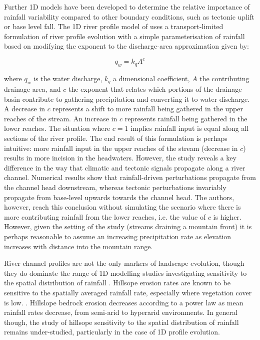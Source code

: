 Further 1D models have been developed to determine the relative importance of rainfall variability compared to other boundary conditions, such as tectonic uplift or base level fall. The 1D river profile model of \citet{Wobus2010} uses a transport-limited formulation of river profile evolution \citep{meyer1948formulas} with a simple parameterisation of rainfall based on modifying the exponent to the discharge-area approximation given by:

\begin{equation}
q_w = k_qA^c
\end{equation}

\noindent
where \(q_w\) is the water discharge, \(k_q\) a dimensional coefficient, \(A\) the contributing drainage area, and \(c\) the exponent that relates which portions of the drainage basin contribute to gathering precipitation and converting it to water discharge. A decrease in \(c\) represents a shift to more rainfall being gathered in the upper reaches of the stream. An increase in \(c\) represents rainfall being gathered in the lower reaches. The situation where \(c = 1\) implies rainfall input is equal along all sections of the river profile. The end result of this formulation is perhaps intuitive: more rainfall input in the upper reaches of the stream (decrease in \(c\)) results in more incision in the headwaters. However, the study reveals a key difference in the way that climatic and tectonic signals propagate along a river channel. Numerical results show that rainfall-driven perturbations propagate from the channel head downstream, whereas tectonic perturbations invariably propagate from base-level upwards towards the channel head. The authors, however, reach this conclusion without simulating the scenario where there is more contributing rainfall from the lower reaches, i.e. the value of \(c\) is higher. However, given the setting of the study (streams draining a mountain front) it is perhaps reasonable to assume an increasing precipitation rate as elevation increases with distance into the mountain range.

River channel profiles are not the only markers of landscape evolution, though they do dominate the range of 1D modelling studies investigating sensitivity to the spatial distribution of rainfall \citep{Tucker2010}. Hillsope erosion rates are known to be sensitive to the spatially averaged rainfall rate, especially where vegetation cover is low. \citep{Owen2011}. Hillslope bedrock erosion decreases according to a power law as mean rainfall rates decrease, from semi-arid to hyperarid environments. In general though, the study of hillsope sensitivity to the spatial distribution of rainfall remains under-studied, particularly in the case of 1D profile evolution.

